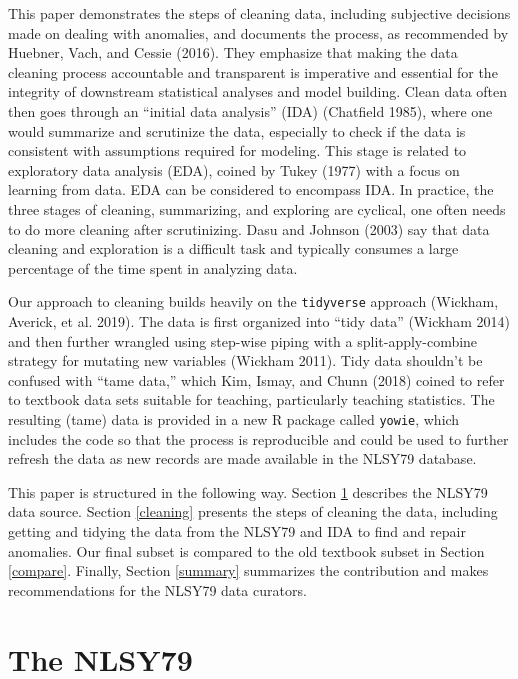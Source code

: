 \documentclass[12pt]{article}
\begin{document}
This paper demonstrates the steps of cleaning data, including subjective decisions made on dealing with anomalies, and documents the process, as recommended by Huebner, Vach, and Cessie (2016). They emphasize that making the data cleaning process accountable and transparent is imperative and essential for the integrity of downstream statistical analyses and model building. Clean data often then goes through an ``initial data analysis'' (IDA) (Chatfield 1985), where one would summarize and scrutinize the data, especially to check if the data is consistent with assumptions required for modeling. This stage is related to exploratory data analysis (EDA), coined by Tukey (1977) with a focus on learning from data. EDA can be considered to encompass IDA. In practice, the three stages of cleaning, summarizing, and exploring are cyclical, one often needs to do more cleaning after scrutinizing. Dasu and Johnson (2003) say that data cleaning and exploration is a difficult task and typically consumes a large percentage of the time spent in analyzing data.

Our approach to cleaning builds heavily on the \texttt{tidyverse} approach (Wickham, Averick, et al. 2019). The data is first organized into ``tidy data'' (Wickham 2014) and then further wrangled using step-wise piping with a split-apply-combine strategy for mutating new variables (Wickham 2011). Tidy data shouldn't be confused with ``tame data,'' which Kim, Ismay, and Chunn (2018) coined to refer to textbook data sets suitable for teaching, particularly teaching statistics. The resulting (tame) data is provided in a new R package called \texttt{yowie}, which includes the code so that the process is reproducible and could be used to further refresh the data as new records are made available in the NLSY79 database.

This paper is structured in the following way. Section \ref{database} describes the NLSY79 data source. Section \ref{cleaning} presents the steps of cleaning the data, including getting and tidying the data from the NLSY79 and IDA to find and repair anomalies. Our final subset is compared to the old textbook subset in Section \ref{compare}. Finally, Section \ref{summary} summarizes the contribution and makes recommendations for the NLSY79 data curators.

\hypertarget{database}{%
\section{The NLSY79}\label{database}}
\end{document}
